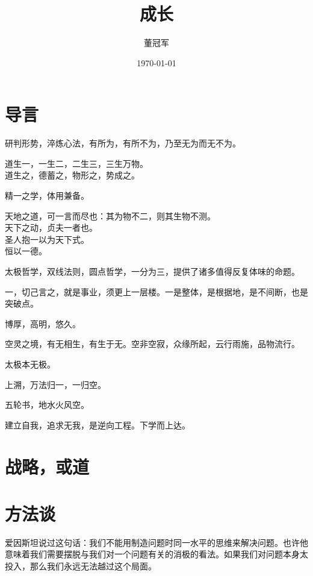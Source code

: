 \documentclass[UTF8]{ctexart}
\title{成长}
\author{董冠军}
\date{\today}
\begin{document}
\maketitle
\tableofcontents

\section{导言}

研判形势，淬炼心法，有所为，有所不为，乃至无为而无不为。

\begin{shadequote}

    道生一，一生二，二生三，三生万物。\\
    道生之，德蓄之，物形之，势成之。
\end{shadequote}

精一之学，体用兼备。
\begin{shadequote}

    天地之道，可一言而尽也：其为物不二，则其生物不测。\\
    天下之动，贞夫一者也。\\
    圣人抱一以为天下式。\\
    恒以一德。
\end{shadequote}

太极哲学，双线法则，圆点哲学，一分为三，提供了诸多值得反复体味的命题。

一，切己言之，就是事业，须更上一层楼。一是整体，是根据地，是不间断，也是突破点。

博厚，高明，悠久。

空灵之境，有无相生，有生于无。空非空寂，众缘所起，云行雨施，品物流行。

太极本无极。

上溯，万法归一，一归空。

五轮书，地水火风空。

建立自我，追求无我，是逆向工程。下学而上达。

\section{战略，或道}

\section{方法谈}

爱因斯坦说过这句话：我们不能用制造问题时同一水平的思维来解决问题。也许他意味着我们需要摆脱与我们对一个问题有关的消极的看法。如果我们对问题本身太投入，那么我们永远无法越过这个局面。
\end{document}
